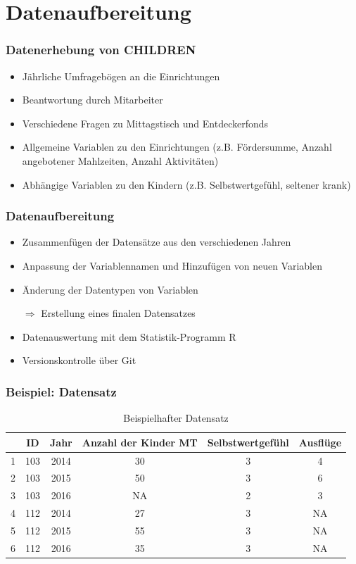 \section{Datenaufbereitung}

\begin{frame}[fragile]
\frametitle{Datenerhebung von CHILDREN}
\begin{itemize}
 \item Jährliche Umfragebögen an die Einrichtungen
 \item Beantwortung durch Mitarbeiter
 \item Verschiedene Fragen zu Mittagstisch und Entdeckerfonds
 \item Allgemeine Variablen zu den Einrichtungen (z.B. Fördersumme, Anzahl angebotener Mahlzeiten, Anzahl Aktivitäten)
 \item Abhängige Variablen zu den Kindern (z.B. Selbstwertgefühl, seltener krank)
\end{itemize}
\end{frame}

\begin{frame}[fragile]
\frametitle{Datenaufbereitung}
\begin{itemize}
 \item Zusammenfügen der Datensätze aus den verschiedenen Jahren
 \item Anpassung der Variablennamen und Hinzufügen von neuen Variablen
 \item Änderung der Datentypen von Variablen
 \item [$\Rightarrow$] Erstellung eines finalen Datensatzes
 \linebreak
 \item Datenauswertung mit dem Statistik-Programm \glqq R\grqq
 \item Versionskontrolle über \glqq Git\grqq
\end{itemize}
\end{frame}

\begin{frame}[fragile]
\frametitle{Beispiel: Datensatz}
\begin{table}[ht]
\centering
\begin{tabular}{lccccc}
  \hline
 & ID & Jahr & Anzahl der Kinder MT & Selbstwertgefühl & Ausflüge \\ 
  \hline
1 & 103 & 2014 & 30 & 3 & 4 \\ 
  2 & 103 & 2015 & 50 & 3 & 6 \\ 
  3 & 103 & 2016 & NA & 2 & 3 \\ 
  4 & 112 & 2014 & 27 & 3 & NA \\ 
  5 & 112 & 2015 & 55 & 3 & NA \\ 
  6 & 112 & 2016 & 35 & 3 & NA \\ 
   \hline
\end{tabular}
\caption{Beispielhafter Datensatz} 
\end{table}
\end{frame}

